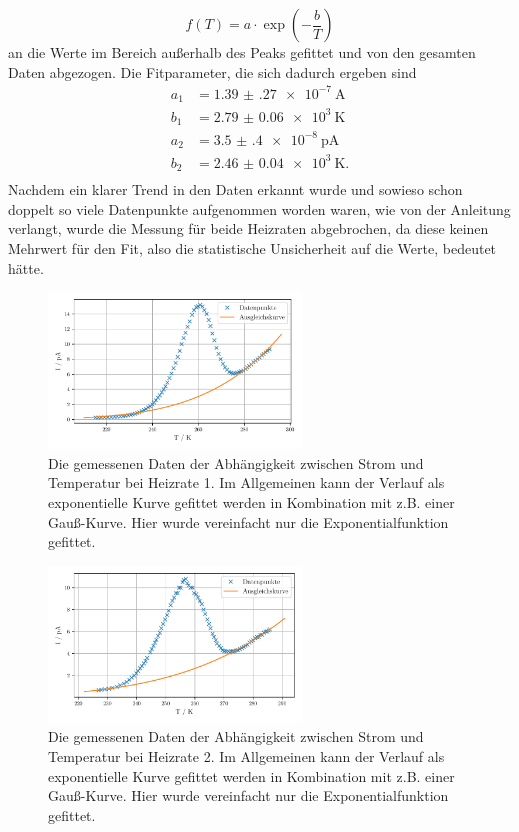 \begin{equation*}
f(T) = a \cdot \exp\left(- \frac{b}{T}\right)
\end{equation*}  
an die Werte im Bereich außerhalb des Peaks gefittet und von den gesamten Daten abgezogen. Die Fitparameter, die sich dadurch ergeben sind 
\begin{align*}
    a_{1} &= \SI{1.39(27)e-7}{\ampere} \\
    b_{1} &= \SI{2.79(6)e3}{\kelvin} \\
    a_{2} &= \SI{3.5(4)e-8}{\pico\ampere} \\
    b_{2} &= \SI{2.46(4)e3}{\kelvin}. \\
\end{align*}
Nachdem ein klarer Trend in den Daten erkannt wurde und sowieso schon doppelt so viele Datenpunkte aufgenommen worden waren, wie von der Anleitung verlangt, wurde die Messung für beide Heizraten abgebrochen, da diese keinen Mehrwert für den Fit, also die statistische Unsicherheit auf die Werte, bedeutet hätte.
\begin{figure}
    \centering
    \includegraphics[width=0.6\textwidth]{figures/data_w_bkg1.pdf}
    \caption{Die gemessenen Daten der Abhängigkeit zwischen Strom und Temperatur bei Heizrate 1. Im Allgemeinen kann der Verlauf als exponentielle Kurve gefittet werden in Kombination mit z.B. einer Gauß-Kurve. Hier wurde vereinfacht nur die Exponentialfunktion gefittet.}
    \label{abb:strom1}
\end{figure}
\begin{figure}
    \centering
    \includegraphics[width=0.6\textwidth]{figures/data_w_bkg2.pdf}
    \caption{Die gemessenen Daten der Abhängigkeit zwischen Strom und Temperatur bei Heizrate 2. Im Allgemeinen kann der Verlauf als exponentielle Kurve gefittet werden in Kombination mit z.B. einer Gauß-Kurve. Hier wurde vereinfacht nur die Exponentialfunktion gefittet.}
    \label{abb:strom2}
\end{figure}
